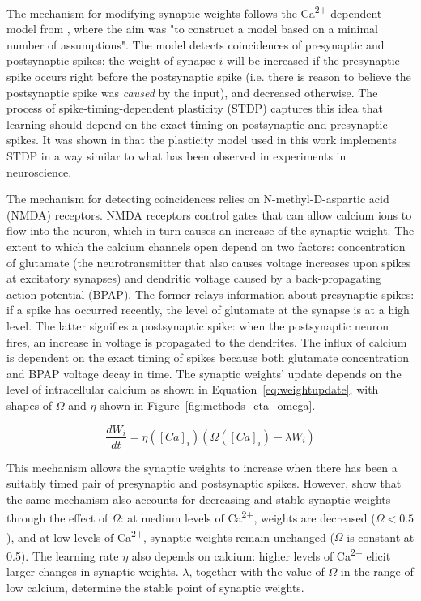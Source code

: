 \documentclass[a4paper,12pt]{report}
\theoremstyle{definition}
\begin{document}
The mechanism for modifying synaptic weights follows the Ca\textsuperscript{2+}-dependent model from \cite{shouval2002unified}, where the aim was "to construct a model based on a minimal number of assumptions". The model detects coincidences of presynaptic and postsynaptic spikes: the weight of synapse $i$ will be increased if the presynaptic spike occurs right before the postsynaptic spike (i.e. there is reason to believe the postsynaptic spike was \emph{caused} by the input), and decreased otherwise. The process of spike-timing-dependent plasticity (STDP) captures this idea that learning should depend on the exact timing on postsynaptic and presynaptic spikes. It was shown in \cite{shouval2002unified} that the plasticity model used in this work implements STDP in a way similar to what has been observed in experiments in neuroscience.

The mechanism for detecting coincidences relies on N-methyl-D-aspartic acid (NMDA) receptors. NMDA receptors control gates that can allow calcium ions to flow into the neuron, which in turn causes an increase of the synaptic weight. The extent to which the calcium channels open depend on two factors: concentration of glutamate (the neurotransmitter that also causes voltage increases upon spikes at excitatory synapses) and dendritic voltage caused by a back-propagating action potential (BPAP). The former relays information about presynaptic spikes: if a spike has occurred recently, the level of glutamate at the synapse is at a high level. The latter signifies a postsynaptic spike: when the postsynaptic neuron fires, an increase in voltage is propagated to the dendrites. The influx of calcium is dependent on the exact timing of spikes because both glutamate concentration and BPAP voltage decay in time. The synaptic weights' update depends on the level of intracellular calcium as shown in Equation~\ref{eq:weightupdate}, with shapes of $\Omega$ and $\eta$ shown in Figure~\ref{fig:methods_eta_omega}.

\begin{equation}
\frac{dW_i}{dt} = \eta ([Ca]_i) (\Omega([Ca]_i) - \lambda W_i)
\label{eq:weightupdate}
\end{equation}

This mechanism allows the synaptic weights to increase when there has been a suitably timed pair of presynaptic and postsynaptic spikes. However, \cite{shouval2002unified} show that the same mechanism also accounts for decreasing and stable synaptic weights through the effect of $\Omega$: at medium levels of Ca\textsuperscript{2+}, weights are decreased ($\Omega<0.5$), and at low levels of Ca\textsuperscript{2+}, synaptic weights remain unchanged ($\Omega$ is constant at 0.5). The learning rate $\eta$ also depends on calcium: higher levels of Ca\textsuperscript{2+} elicit larger changes in synaptic weights. $\lambda$, together with the value of $\Omega$ in the range of low calcium, determine the stable point of synaptic weights.
\end{document}
